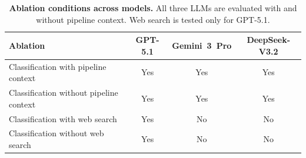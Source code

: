 \begin{table}[H]
\centering
\caption{\textbf{Ablation conditions across models.} All three LLMs are evaluated with and without pipeline context. Web search is tested only for GPT-5.1.}
\label{tab:ablation_conditions}
\begin{tabular}{lccc}
\toprule
\textbf{Ablation} & \textbf{GPT-5.1} & \textbf{Gemini~3~Pro} & \textbf{DeepSeek-V3.2} \\
\midrule
Classification with pipeline context & Yes & Yes & Yes \\
Classification without pipeline context & Yes & Yes & Yes \\
Classification with web search & Yes & No & No \\
Classification without web search & Yes & No & No \\
\bottomrule
\end{tabular}
\end{table}
